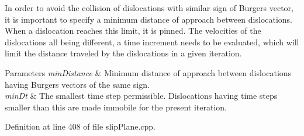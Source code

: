 In order to avoid the collision of dislocations with similar sign of Burgers vector, it is important to specify a minimum distance of approach between dislocations. When a dislocation reaches this limit, it is pinned. The velocities of the dislocations all being different, a time increment needs to be evaluated, which will limit the distance traveled by the dislocations in a given iteration. 
\begin{DoxyParams}{Parameters}
{\em min\-Distance} & Minimum distance of approach between dislocations having Burgers vectors of the same sign. \\
\hline
{\em min\-Dt} & The smallest time step permissible. Dislocations having time steps smaller than this are made immobile for the present iteration. \\
\hline
\end{DoxyParams}


Definition at line 408 of file slip\-Plane.\-cpp.



